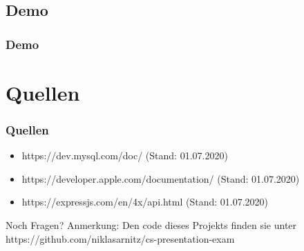 \documentclass[aspectratio=169]{beamer}
\begin{document}
\subsection{Demo}
\begin{frame}
	\frametitle{Demo}
	\center
\end{frame}

\section{Quellen}
\begin{frame}
	\frametitle{Quellen}
	\begin{itemize}
		\item https://dev.mysql.com/doc/ (Stand: 01.07.2020)
		\item https://developer.apple.com/documentation/ (Stand: 01.07.2020)
		\item https://expressjs.com/en/4x/api.html (Stand: 01.07.2020)
	\end{itemize}	
\end{frame}

\begin{frame}
	\center
	\huge{Noch Fragen?}
	Anmerkung: Den code dieses Projekts finden sie unter https://github.com/niklasarnitz/cs-presentation-exam
\end{frame}
\end{document}
